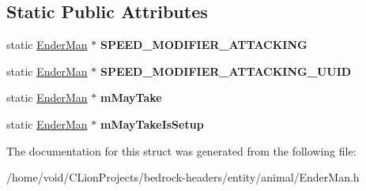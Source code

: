 \subsection*{Static Public Attributes}
\begin{DoxyCompactItemize}
\item 
\mbox{\label{struct_ender_man_a700da2c5d24ced6bd4112554f62a1af5}} 
static \mbox{\hyperlink{struct_ender_man}{Ender\+Man}} $\ast$ {\bfseries S\+P\+E\+E\+D\+\_\+\+M\+O\+D\+I\+F\+I\+E\+R\+\_\+\+A\+T\+T\+A\+C\+K\+I\+NG}
\item 
\mbox{\label{struct_ender_man_ab8a4c081a4865f7e456483f036acffd4}} 
static \mbox{\hyperlink{struct_ender_man}{Ender\+Man}} $\ast$ {\bfseries S\+P\+E\+E\+D\+\_\+\+M\+O\+D\+I\+F\+I\+E\+R\+\_\+\+A\+T\+T\+A\+C\+K\+I\+N\+G\+\_\+\+U\+U\+ID}
\item 
\mbox{\label{struct_ender_man_af7bc371add395380eb2cff14d3cb0e8f}} 
static \mbox{\hyperlink{struct_ender_man}{Ender\+Man}} $\ast$ {\bfseries m\+May\+Take}
\item 
\mbox{\label{struct_ender_man_a7c764f0cab3b8a0a97af26ac499f463b}} 
static \mbox{\hyperlink{struct_ender_man}{Ender\+Man}} $\ast$ {\bfseries m\+May\+Take\+Is\+Setup}
\end{DoxyCompactItemize}


The documentation for this struct was generated from the following file\+:\begin{DoxyCompactItemize}
\item 
/home/void/\+C\+Lion\+Projects/bedrock-\/headers/entity/animal/Ender\+Man.\+h\end{DoxyCompactItemize}
